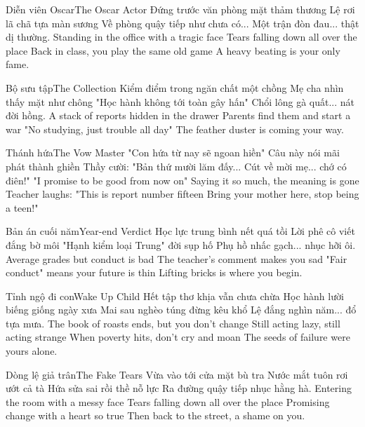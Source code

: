 \begin{tutuyetbox}{Diễn viên Oscar}{The Oscar Actor}
Đứng trước văn phòng mặt thảm thương
Lệ rơi lã chã tựa màn sương
Về phòng quậy tiếp như chưa có...
Một trận đòn đau... thật dị thường.
\tcblower
Standing in the office with a tragic face
Tears falling down all over the place
Back in class, you play the same old game
A heavy beating is your only fame.
\end{tutuyetbox}

\begin{tutuyetbox}{Bộ sưu tập}{The Collection}
Kiểm điểm trong ngăn chất một chồng
Mẹ cha nhìn thấy mặt như chông
"Học hành không tới toàn gây hấn"
Chổi lông gà quất... nát đời hồng.
\tcblower
A stack of reports hidden in the drawer
Parents find them and start a war
"No studying, just trouble all day"
The feather duster is coming your way.
\end{tutuyetbox}

\begin{tutuyetbox}{Thánh hứa}{The Vow Master}
"Con hứa từ nay sẽ ngoan hiền"
Câu này nói mãi phát thành ghiền
Thầy cười: "Bản thứ mười lăm đấy...
Cút về mời mẹ... chớ có điên!"
\tcblower
"I promise to be good from now on"
Saying it so much, the meaning is gone
Teacher laughs: "This is report number fifteen
Bring your mother here, stop being a teen!"
\end{tutuyetbox}

\begin{tutuyetbox}{Bản án cuối năm}{Year-end Verdict}
Học lực trung bình nết quá tồi
Lời phê cô viết đắng bờ môi
"Hạnh kiểm loại Trung" đời sụp hố
Phụ hồ nhấc gạch... nhục hỡi ôi.
\tcblower
Average grades but conduct is bad
The teacher's comment makes you sad
"Fair conduct" means your future is thin
Lifting bricks is where you begin.
\end{tutuyetbox}

\begin{tutuyetbox}{Tỉnh ngộ đi con}{Wake Up Child}
Hết tập thơ khịa vẫn chưa chừa
Học hành lười biếng giống ngày xưa
Mai sau nghèo túng đừng kêu khổ
Lệ đắng nghìn năm... đổ tựa mưa.
\tcblower
The book of roasts ends, but you don't change
Still acting lazy, still acting strange
When poverty hits, don't cry and moan
The seeds of failure were yours alone.
\end{tutuyetbox}
\begin{tutuyetbox}{Dòng lệ giả trân}{The Fake Tears}
Vừa vào tới cửa mặt bù tra
Nước mắt tuôn rơi ướt cả tà
Hứa sửa sai rồi thề nỗ lực
Ra đường quậy tiếp nhục hằng hà.
\tcblower
Entering the room with a messy face
Tears falling down all over the place
Promising change with a heart so true
Then back to the street, a shame on you.
\end{tutuyetbox}

